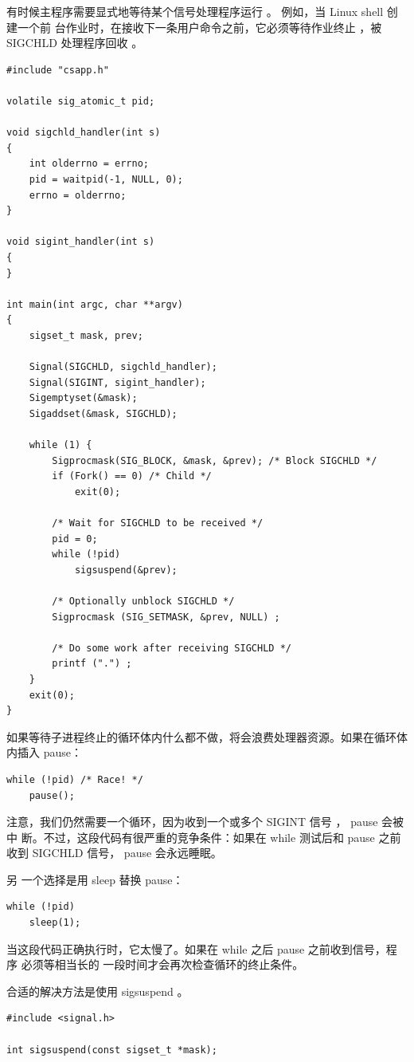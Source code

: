 有时候主程序需要显式地等待某个信号处理程序运行 。 例如，当 Linux shell 创建一个前
台作业时，在接收下一条用户命令之前，它必须等待作业终止 ，被 SIGCHLD 处理程序回收 。

\begin{lstlisting}[style=CStyle]
#include "csapp.h"

volatile sig_atomic_t pid;

void sigchld_handler(int s)
{
    int olderrno = errno;
    pid = waitpid(-1, NULL, 0);
    errno = olderrno;
}
 
void sigint_handler(int s)
{
}
 
int main(int argc, char **argv)
{
    sigset_t mask, prev;

    Signal(SIGCHLD, sigchld_handler);
    Signal(SIGINT, sigint_handler);
    Sigemptyset(&mask);
    Sigaddset(&mask, SIGCHLD);
    
    while (1) {
        Sigprocmask(SIG_BLOCK, &mask, &prev); /* Block SIGCHLD */
        if (Fork() == 0) /* Child */
            exit(0);
        
        /* Wait for SIGCHLD to be received */
        pid = 0;
        while (!pid)
            sigsuspend(&prev);

        /* Optionally unblock SIGCHLD */
        Sigprocmask (SIG_SETMASK, &prev, NULL) ;

        /* Do some work after receiving SIGCHLD */
        printf (".") ;
    }
    exit(0);
}
\end{lstlisting}

如果等待子进程终止的循环体内什么都不做，将会浪费处理器资源。如果在循环体内插入 pause：
\begin{lstlisting}[style=CStyle]
while (!pid) /* Race! */
    pause();
\end{lstlisting}

注意，我们仍然需要一个循环，因为收到一个或多个 SIGINT 信号 ， pause 会被中
断。不过，这段代码有很严重的竞争条件：如果在 while 测试后和 pause 之前收到
SIGCHLD 信号， pause 会永远睡眠。

另 一个选择是用 sleep 替换 pause：
\begin{lstlisting}[style=CStyle]
while (!pid)
    sleep(1);
\end{lstlisting}

当这段代码正确执行时，它太慢了。如果在 while 之后 pause 之前收到信号，程序
必须等相当长的 一段时间才会再次检查循环的终止条件。

合适的解决方法是使用 sigsuspend 。

\begin{lstlisting}[style=CStyle]
#include <signal.h>

int sigsuspend(const sigset_t *mask);
\end{lstlisting}

